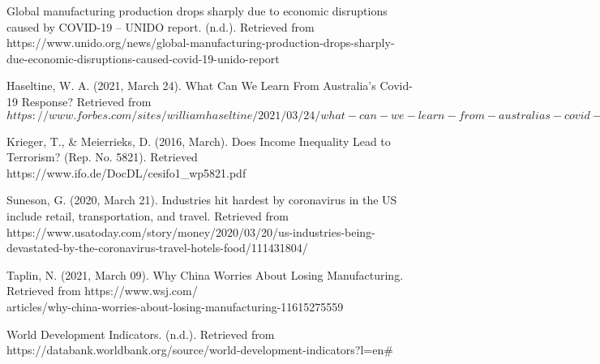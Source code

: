 \documentclass[fontsize=11pt]{article}
\begin{document}
    \item Global manufacturing production drops sharply due to economic disruptions caused by COVID-19 – UNIDO report. (n.d.). Retrieved from https://www.unido.org/news/global-manufacturing-production-drops-sharply-due-economic-disruptions-caused-covid-19-unido-report \\
    \item Haseltine, W. A. (2021, March 24). What Can We Learn From Australia's Covid-19 Response? Retrieved from $https://www.forbes.com/sites/williamhaseltine/2021/03/24/what-can-we-learn-from-australias-covid-19-response/?sh=192a771b3a01$ \\
    \item Krieger, T., & Meierrieks, D. (2016, March). Does Income Inequality Lead to Terrorism? (Rep. No. 5821). Retrieved https://www.ifo.de/DocDL/cesifo1\_wp5821.pdf \\
    \item Suneson, G. (2020, March 21). Industries hit hardest by coronavirus in the US include retail, transportation, and travel. Retrieved from https://www.usatoday.com/story/money/2020/03/20/us-industries-being-devastated-by-the-coronavirus-travel-hotels-food/111431804/ \\
    \item Taplin, N. (2021, March 09). Why China Worries About Losing Manufacturing. Retrieved from https://www.wsj.com/\\articles/why-china-worries-about-losing-manufacturing-11615275559 \\
    \item World Development Indicators. (n.d.). Retrieved from https://databank.worldbank.org/source/world-development-indicators?l=en# \\



\end{document}
